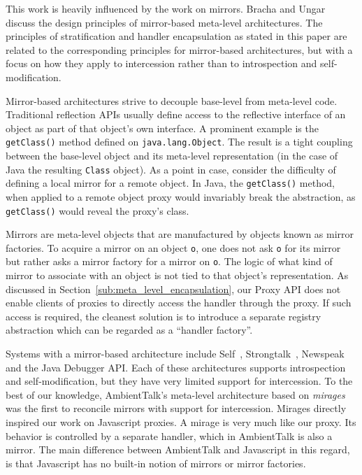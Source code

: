 \documentclass{sig-alternate}
\begin{document}
This work is heavily influenced by the work on mirrors. Bracha and Ungar~\cite{bracha04mirrors} discuss the design principles of mirror-based meta-level architectures. The principles of stratification and handler encapsulation as stated in this paper are related to the corresponding principles for mirror-based architectures, but with a focus on how they apply to intercession rather than to introspection and self-modification.

Mirror-based architectures strive to decouple base-level from meta-level code. Traditional reflection APIs usually define access to the reflective interface of an object as part of that object's own interface. A prominent example is the \texttt{getClass()} method defined on \texttt{java.lang.Object}. The result is a tight coupling between the base-level object and its meta-level representation (in the case of Java the resulting \texttt{Class} object). As a point in case, consider the difficulty of defining a local mirror for a remote object. In Java, the \texttt{getClass()} method, when applied to a remote object proxy would invariably break the abstraction, as \texttt{getClass()} would reveal the proxy's class.

Mirrors are meta-level objects that are manufactured by objects known as mirror factories. To acquire a mirror on an object \texttt{o}, one does not ask \texttt{o} for its mirror but rather asks a mirror factory for a mirror on \texttt{o}. The logic of what kind of mirror to associate with an object is not tied to that object's representation. As discussed in Section~\ref{sub:meta_level_encapsulation}, our Proxy API does not enable clients of proxies to directly access the handler through the proxy. If such access is required, the cleanest solution is to introduce a separate registry abstraction which can be regarded as a ``handler factory''.

Systems with a mirror-based architecture include Self~\cite{ungar87power}, Strongtalk~\cite{bracha93strongtalk}, Newspeak~\cite{bracha10newspeak} and the Java Debugger API. Each of these architectures supports introspection and self-modification, but they have very limited support for intercession. To the best of our knowledge, AmbientTalk's meta-level architecture based on \emph{mirages}~\cite{mostinckx07behavioral} was the first to reconcile mirrors with support for intercession. Mirages directly inspired our work on Javascript proxies. A mirage is very much like our proxy. Its behavior is controlled by a separate handler, which in AmbientTalk is also a mirror. The main difference between AmbientTalk and Javascript in this regard, is that Javascript has no built-in notion of mirrors or mirror factories.
\end{document}
